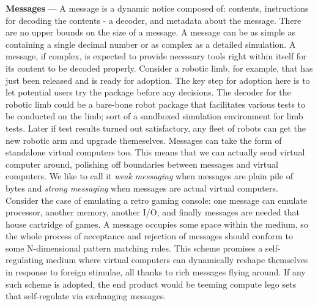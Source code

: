 \documentclass[a4paper, 10pt]{article}
\begin{document}
\textbf{Messages} --- A message is a dynamic notice composed of: contents, instructions for decoding the contents - a decoder, and metadata about the message. There are no upper bounds on the size of a message. A message can be as simple as containing a single decimal number or as complex as a detailed simulation. A message, if complex, is expected to provide necessary tools right within itself for its content to be decoded properly. Consider a robotic limb, for example, that has just been released and is ready for adoption. The key step for adoption here is to let potential users try the package before any decisions. The decoder for the robotic limb could be a bare-bone robot package that facilitates various tests to be conducted on the limb; sort of a sandboxed simulation environment for limb tests. Later if test results turned out satisfactory, any fleet of robots can get the new robotic arm and upgrade themeselves. Messages can take the form of standalone virtual computers too. This means that we can actually send virtual computer around, polishing off boundaries between messages and virtual computers. We like to call it \textit{weak messaging} when messages are plain pile of bytes and \textit{strong messaging} when messages are actual virtual computers. Consider the case of emulating a retro gaming console: one message can emulate processor, another memory, another I/O, and finally messages are needed that house cartridge of games. A message occupies some space within the medium, so the whole process of acceptance and rejection of messages should conform to some N-dimensional pattern matching rules. This scheme promises a self-regulating medium where virtual computers can dynamically reshape themselves in response to foreign stimulae, all thanks to rich messages flying around. If any such scheme is adopted, the end product would be teeming compute lego sets that self-regulate via exchanging messages. 
\par
\end{document}
